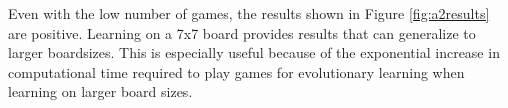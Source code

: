 \documentclass[11pt]{report}
\begin{document}
Even with the low number of games, the results shown in Figure \ref{fig:a2results} are positive. Learning on a 7x7 board provides results that can generalize to larger boardsizes. This is especially useful because of the exponential increase in computational time required to play games for evolutionary learning when learning on larger board sizes.



\end{document}
